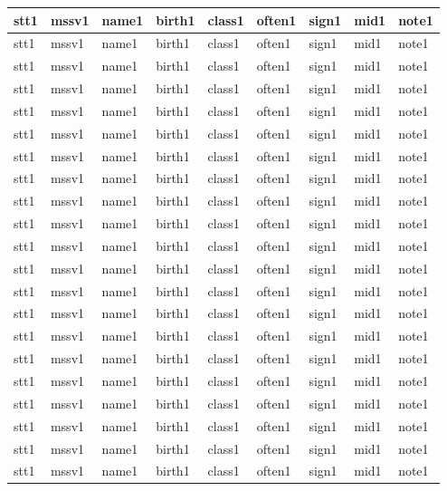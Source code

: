 \documentclass[14pt,a4paper]{article}
\begin{document}
\begin{tabular}{ m{0.7cm} | m{2cm}| m{4cm} | m{2cm} | m{2.5cm} | m{1.2cm} | m{1.5cm} | m{1cm} | m{1.6cm} | }
		\hline
		stt1 & mssv1 & name1 & birth1 & class1 & often1 & sign1 & mid1 & note1\\
		\hline
		stt1 & mssv1 & name1 & birth1 & class1 & often1 & sign1 & mid1 & note1\\
		\hline
		stt1 & mssv1 & name1 & birth1 & class1 & often1 & sign1 & mid1 & note1\\
		\hline
		stt1 & mssv1 & name1 & birth1 & class1 & often1 & sign1 & mid1 & note1\\
		\hline
		stt1 & mssv1 & name1 & birth1 & class1 & often1 & sign1 & mid1 & note1\\
		\hline
		stt1 & mssv1 & name1 & birth1 & class1 & often1 & sign1 & mid1 & note1\\
		\hline
		stt1 & mssv1 & name1 & birth1 & class1 & often1 & sign1 & mid1 & note1\\
		\hline
		stt1 & mssv1 & name1 & birth1 & class1 & often1 & sign1 & mid1 & note1\\
		\hline
		stt1 & mssv1 & name1 & birth1 & class1 & often1 & sign1 & mid1 & note1\\
		\hline
		stt1 & mssv1 & name1 & birth1 & class1 & often1 & sign1 & mid1 & note1\\
		\hline
		stt1 & mssv1 & name1 & birth1 & class1 & often1 & sign1 & mid1 & note1\\
		\hline
		stt1 & mssv1 & name1 & birth1 & class1 & often1 & sign1 & mid1 & note1\\
		\hline
		stt1 & mssv1 & name1 & birth1 & class1 & often1 & sign1 & mid1 & note1\\
		\hline
		stt1 & mssv1 & name1 & birth1 & class1 & often1 & sign1 & mid1 & note1\\
		\hline
		stt1 & mssv1 & name1 & birth1 & class1 & often1 & sign1 & mid1 & note1\\
		\hline
		stt1 & mssv1 & name1 & birth1 & class1 & often1 & sign1 & mid1 & note1\\
		\hline
		stt1 & mssv1 & name1 & birth1 & class1 & often1 & sign1 & mid1 & note1\\
		\hline
		stt1 & mssv1 & name1 & birth1 & class1 & often1 & sign1 & mid1 & note1\\
		\hline
		stt1 & mssv1 & name1 & birth1 & class1 & often1 & sign1 & mid1 & note1\\
		\hline
		stt1 & mssv1 & name1 & birth1 & class1 & often1 & sign1 & mid1 & note1\\
		\hline
		stt1 & mssv1 & name1 & birth1 & class1 & often1 & sign1 & mid1 & note1\\

\end{tabular}
\end{document}
